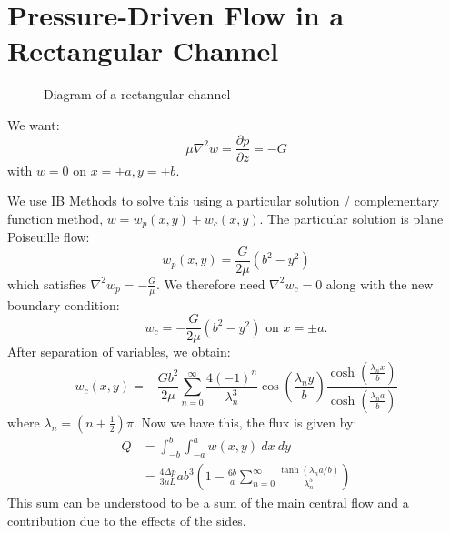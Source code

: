 \documentclass[../Main.tex]{subfiles}
\begin{document}
\section{Pressure-Driven Flow in a Rectangular Channel}
\begin{figure}
    \centering
    \caption{Diagram of a rectangular channel}
    \label{figRectChannel}
\end{figure}
We want:
\begin{equation*}
    \mu \nabla^2 w = \frac{\partial p}{\partial z} = -G
\end{equation*}
with $w = 0$ on $x = \pm a, y = \pm b$.

We use IB Methods to solve this using a particular solution / complementary function method, $w = w_p(x, y) + w_c(x, y)$. The particular solution is plane Poiseuille flow:
\begin{equation*}
    w_p(x, y) = \frac{G}{2\mu} \left(b^2 - y^2\right)
\end{equation*}
which satisfies $\nabla^2 w_p = - \frac{G}{\mu}$. We therefore need $\nabla^2 w_c = 0$ along with the new boundary condition:
\begin{equation*}
    w_c = - \frac{G}{2\mu} (b^2 - y^2) \text{ on } x = \pm a.
\end{equation*}
After separation of variables, we obtain:
\begin{equation*}
    w_c(x, y) = -\frac{Gb^2}{2\mu} \sum_{n=0}^{\infty} \frac{4(-1)^n}{\lambda_n^3} \cos\left(\frac{\lambda_n y}{b}\right) \frac{\cosh\left(\frac{\lambda_n x}{b}\right)}{\cosh\left(\frac{\lambda_n a}{b}\right)}
\end{equation*}
where $\lambda_n = \left(n + \frac12\right)\pi$. Now we have this, the flux is given by:
\begin{align*}
    Q &= \int_{-b}^{b} \int_{-a}^{a} w(x, y)~dx~dy \\
    &= \frac{4 \Delta p}{3\mu L} ab^3 \left(1 - \frac{6b}{a} \sum_{n=0}^{\infty} \frac{\tanh(\lambda_n a / b)}{\lambda_n^5}\right)
\end{align*}
This sum can be understood to be a sum of the main central flow and a contribution due to the effects of the sides.
\end{document}
